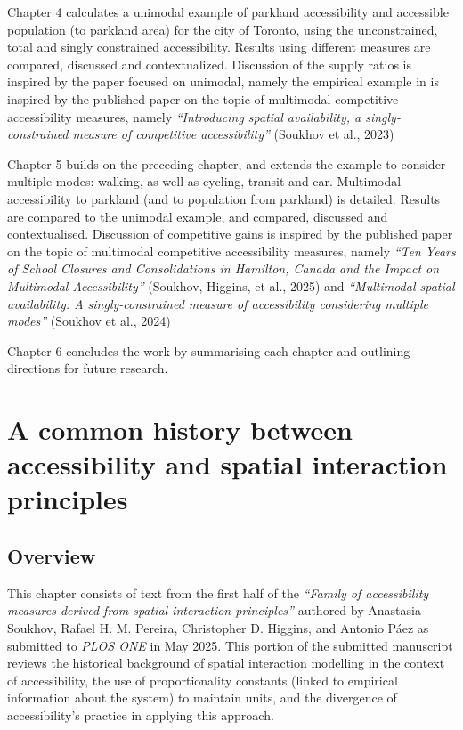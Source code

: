 \documentclass[
11pt, %
oneside, %
english, %
singlespacing, %
]{macthesis} %
\begin{document}
Chapter 4 calculates a unimodal example of parkland accessibility and accessible population (to parkland area) for the city of Toronto, using the unconstrained, total and singly constrained accessibility. Results using different measures are compared, discussed and contextualized. Discussion of the supply ratios is inspired by the paper focused on unimodal, namely the empirical example in is inspired by the published paper on the topic of multimodal competitive accessibility measures, namely \emph{``Introducing spatial availability, a singly-constrained measure of competitive accessibility''} (Soukhov et al., 2023)

Chapter 5 builds on the preceding chapter, and extends the example to consider multiple modes: walking, as well as cycling, transit and car. Multimodal accessibility to parkland (and to population from parkland) is detailed. Results are compared to the unimodal example, and compared, discussed and contextualised. Discussion of competitive gains is inspired by the published paper on the topic of multimodal competitive accessibility measures, namely \emph{``Ten Years of School Closures and Consolidations in Hamilton, Canada and the Impact on Multimodal Accessibility''} (Soukhov, Higgins, et al., 2025) and \emph{``Multimodal spatial availability: A singly-constrained measure of accessibility considering multiple modes''} (Soukhov et al., 2024)

Chapter 6 concludes the work by summarising each chapter and outlining directions for future research.

\chapter{A common history between accessibility and spatial interaction principles}\label{a-common-history-between-accessibility-and-spatial-interaction-principles}

\section{Overview}\label{overview-1}

This chapter consists of text from the first half of the \emph{``Family of accessibility measures derived from spatial interaction principles''} authored by Anastasia Soukhov, Rafael H. M. Pereira, Christopher D. Higgins, and Antonio Páez as submitted to \emph{PLOS ONE} in May 2025. This portion of the submitted manuscript reviews the historical background of spatial interaction modelling in the context of accessibility, the use of proportionality constants (linked to empirical information about the system) to maintain units, and the divergence of accessibility's practice in applying this approach.
\end{document}
